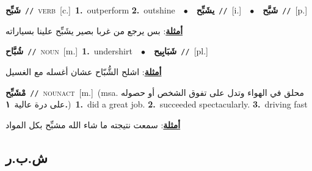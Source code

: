 \documentclass[10pt,a4paper,twoside]{article} %
\begin{document}
\begin{multicols}{2}
{{{{{{\setlength\topsep{0pt}\textbf{\foreignlanguage{arabic}{شَبِّح}}\ {\color{gray}\texttt{//}\color{black}}\ \textsc{verb}\ [c.]\ \textbf{1.}~outperform  \textbf{2.}~outshine\ \ $\bullet$\ \ \setlength\topsep{0pt}\textbf{\foreignlanguage{arabic}{يشَبِّح}}\ {\color{gray}\texttt{//}\color{black}}\ [i.]\ \ $\bullet$\ \ \setlength\topsep{0pt}\textbf{\foreignlanguage{arabic}{شَبَّح}}\ {\color{gray}\texttt{//}\color{black}}\ [p.]\  \begin{flushright}\color{gray}\foreignlanguage{arabic}{\textbf{\underline{\foreignlanguage{arabic}{أمثلة}}}: بس يرجع من غربا بصير يشَبِّح علينا بسياراته}\end{flushright}\color{black}} \vspace{2mm}

{\setlength\topsep{0pt}\textbf{\foreignlanguage{arabic}{شُبَّاح}}\ {\color{gray}\texttt{//}\color{black}}\ \textsc{noun}\ [m.]\ \textbf{1.}~undershirt\ \ $\bullet$\ \ \setlength\topsep{0pt}\textbf{\foreignlanguage{arabic}{شَبَابِيح}}\ {\color{gray}\texttt{//}\color{black}}\ [pl.]\  \begin{flushright}\color{gray}\foreignlanguage{arabic}{\textbf{\underline{\foreignlanguage{arabic}{أمثلة}}}: اشلح الشُّبّاح عشان أغسله مع الغسيل}\end{flushright}\color{black}} \vspace{2mm}

{\setlength\topsep{0pt}\textbf{\foreignlanguage{arabic}{مْشَبِّح}}\ {\color{gray}\texttt{//}\color{black}}\ \textsc{noun\textunderscore act}\ [m.]\ \color{gray}(msa. \foreignlanguage{arabic}{محلق في الهواء وتدل على تفوق الشخص أو حصوله على درة عالية}~\foreignlanguage{arabic}{\textbf{١.}})\color{black}\ \textbf{1.}~did a great job.  \textbf{2.}~succeeded spectacularly.  \textbf{3.}~driving fast\  \begin{flushright}\color{gray}\foreignlanguage{arabic}{\textbf{\underline{\foreignlanguage{arabic}{أمثلة}}}: سمعت نتيجته ما شاء الله مشبِّح بكل المواد}\end{flushright}\color{black}} \vspace{2mm}

\vspace{-3mm}
\subsection*{\color{blue}\foreignlanguage{arabic}{ش.ب.ر}\color{blue}{}} 

}}}}}
\end{multicols}
\end{document}
